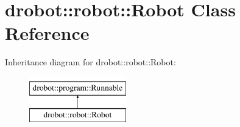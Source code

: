 \hypertarget{classdrobot_1_1robot_1_1Robot}{\section{drobot\-:\-:robot\-:\-:Robot Class Reference}
\label{classdrobot_1_1robot_1_1Robot}
}
Inheritance diagram for drobot\-:\-:robot\-:\-:Robot\-:\begin{figure}[H]
\begin{center}
\leavevmode
\includegraphics[height=2.000000cm]{classdrobot_1_1robot_1_1Robot}
\end{center}
\end{figure}
